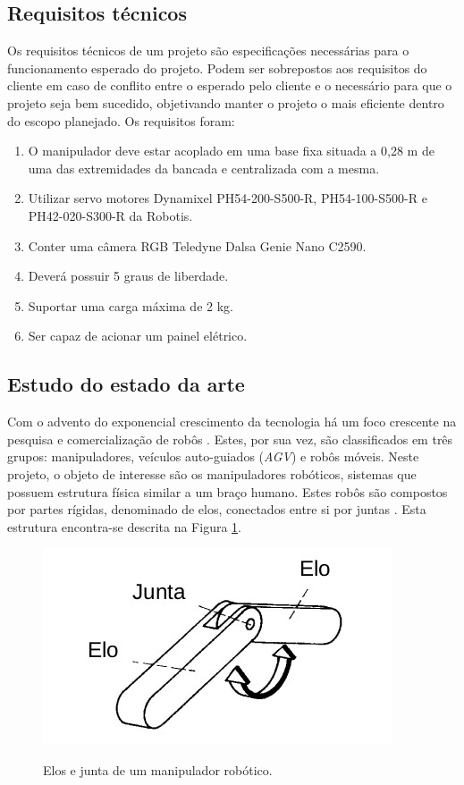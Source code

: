 \subsection{Requisitos técnicos}
\label{sub:reqt}
Os requisitos técnicos de um projeto são especificações necessárias para o funcionamento esperado do projeto. Podem ser sobrepostos aos requisitos do cliente em caso de conflito entre o esperado pelo cliente e o necessário para que o projeto seja bem sucedido, objetivando manter o projeto o mais eficiente dentro do escopo planejado. Os requisitos foram:
\begin{enumerate}
    \item O manipulador deve estar acoplado em uma base fixa situada a 0,28 m de uma das extremidades da bancada e centralizada com a mesma.
    \item Utilizar servo motores Dynamixel PH54-200-S500-R, PH54-100-S500-R e PH42-020-S300-R da Robotis. 
    \item Conter uma câmera RGB Teledyne Dalsa Genie Nano C2590. 
    \item Deverá possuir 5 graus de liberdade.
    \item Suportar uma carga máxima de 2 kg. 
    \item Ser capaz de acionar um painel elétrico.
\end{enumerate}

\subsection{Estudo do estado da arte}
\label{sub:sota}

\par Com o advento do exponencial crescimento da tecnologia há um foco crescente na pesquisa e comercialização de robôs \cite{hernandez2018education}. Estes, por sua vez, são classificados em três grupos: manipuladores, veículos auto-guiados (\textit{\acs{AGV}}) e robôs móveis. Neste projeto, o objeto de interesse são os manipuladores robóticos, sistemas que possuem estrutura física similar a um braço humano. Estes robôs são compostos por partes rígidas, denominado de elos, conectados entre si por juntas \cite{santos2004robotica}. Esta estrutura encontra-se descrita na Figura \ref{fig:manipulador}.

\begin{figure}
    \caption{Elos e junta de um manipulador robótico.}
    \centering
    \includegraphics[scale=0.6]{images/manipulador.jpg}
    \label{fig:manipulador}
\end{figure}

